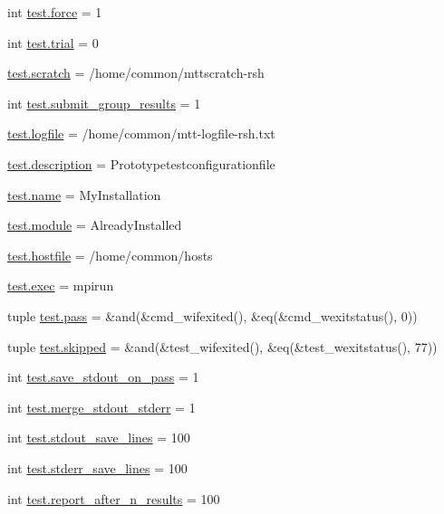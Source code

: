 \begin{DoxyCompactItemize}
\item 
int \hyperlink{namespacetest_ad4773f49ae244cf1cfa3fe9cbbce0d67}{test.\-force} = 1
\item 
int \hyperlink{namespacetest_a0e85c866c38cad5d7ae36d1115224da0}{test.\-trial} = 0
\item 
\hyperlink{namespacetest_aab6125cbc3654cbeb0f5df11bf28b3f1}{test.\-scratch} = /home/common/mttscratch-\/rsh
\item 
int \hyperlink{namespacetest_afa4c185ba5d92fdbefba5736ef442945}{test.\-submit\-\_\-group\-\_\-results} = 1
\item 
\hyperlink{namespacetest_ad95cf6979c5decba613e5a1d5ffe07a7}{test.\-logfile} = /home/common/mtt-\/logfile-\/rsh.\-txt
\item 
\hyperlink{namespacetest_a1c2a3a63faa9854257983fbb3de9e11d}{test.\-description} = Prototypetestconfigurationfile
\item 
\hyperlink{namespacetest_ac5ddc75d7029ace1bfb95e457e5c3510}{test.\-name} = My\-Installation
\item 
\hyperlink{namespacetest_ab75fa7ca9f0cb2bcac8a454434a9f2ed}{test.\-module} = Already\-Installed
\item 
\hyperlink{namespacetest_aa7f544791c7eba91f19e926b661617a1}{test.\-hostfile} = /home/common/hosts
\item 
\hyperlink{namespacetest_a306f9d9d5c20138c75077ea9bb2b2df4}{test.\-exec} = mpirun
\item 
tuple \hyperlink{namespacetest_abc155792ba7b2057124cc069e596899f}{test.\-pass} = \&and(\&cmd\-\_\-wifexited(), \&eq(\&cmd\-\_\-wexitstatus(), 0))
\item 
tuple \hyperlink{namespacetest_a7a09931cf523b8af2e201bee605f000c}{test.\-skipped} = \&and(\&test\-\_\-wifexited(), \&eq(\&test\-\_\-wexitstatus(), 77))
\item 
int \hyperlink{namespacetest_ad6c2143462bf99c62dcb7cf691a56394}{test.\-save\-\_\-stdout\-\_\-on\-\_\-pass} = 1
\item 
int \hyperlink{namespacetest_ab42f6c72b039645ef575cfb31b7b99e8}{test.\-merge\-\_\-stdout\-\_\-stderr} = 1
\item 
int \hyperlink{namespacetest_ad4c8d1b4c04f99668eb1f7168aee5dec}{test.\-stdout\-\_\-save\-\_\-lines} = 100
\item 
int \hyperlink{namespacetest_a6eb3ee4197f9fe28682af6f06cbc5e8f}{test.\-stderr\-\_\-save\-\_\-lines} = 100
\item 
int \hyperlink{namespacetest_a86e28e32de6c6c5e79ed64d05f513b97}{test.\-report\-\_\-after\-\_\-n\-\_\-results} = 100

\end{DoxyCompactItemize}
